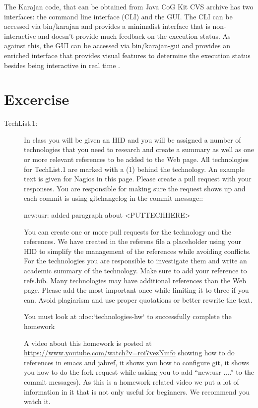      The Karajan code, that can be obtained from Java CoG Kit CVS
     archive has two interfaces: the command line interface (CLI) and
     the GUI.  The CLI can be accessed via bin/karajan and provides a
     minimalist interface that is non-interactive and doesn't provide
     much feedback on the execution status.  As against this, the GUI
     can be accessed via bin/karajan-gui and provides an enriched
     interface that provides visual features to determine the
     execution status besides being interactive in real time
     \cite{Karajan-interfaces}.


\section{Excercise}

\begin{description}

\item[TechList.1:] In class you will be given an HID and you will be assigned
  a number of technologies that you need to research and create a
  summary as well as one or more relevant references to be added to the
  Web page. All technologies for TechList.1 are marked with a (1)
  behind the technology.  An example text is given for Nagios in this
  page.  Please create a pull request with your responses. You are
  responsible for making sure the request shows up and each commit is
  using gitchangelog in the commit message::

    new:usr: added paragraph about <PUTTECHHERE>

  You can create one or more pull requests for the technology and the
  references. We have created in the referens file a placeholder using
  your HID to simplify the management of the references while avoiding
  conflicts.  For the technologies you are responsible to investigate
  them and write an academic summary of the technology. Make sure to
  add your reference to refs.bib.  Many technologies may have
  additional references than the Web page. Please add the most
  important once while limiting it to three if you can. Avoid
  plagiarism and use proper quotations or better rewrite the text.

  You must look at :doc:`technologies-hw` to successfully complete the
  homework

  A video about this homework is posted at
  \url{https://www.youtube.com/watch?v=roi7vezNmfo} showing how to
  do references in emacs and jabref, it shows you how to configure
  git, it shows you how to do the fork request while asking you to add
  ``new:usr ....'' to the commit messages). As this is a homework
  related video we put a lot of information in it that is not only
  useful for beginners. We recommend you watch it.



\end{description}
